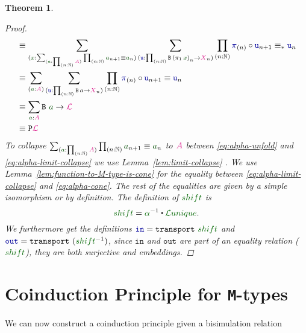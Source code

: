 \documentclass[twoside,11pt,openright]{report}
\theoremstyle{plain} %
\newtheorem{thm}{Theorem}[section]
\theoremstyle{definition}
\theoremstyle{remark}
\newcommand*{\lemref}[1]{Lemma~\ref{lem:#1}}
\newcommand*{\term}[1]{\textcolor{green!30!black}{#1}} %
\newcommand*{\pathterm}[1]{\textcolor{green!40!black}{#1}}
\newcommand*{\type}[1]{\textcolor{magenta!90!black}{#1}}
\newcommand*{\function}[1]{\textcolor{blue!60!black}{\ensuremath{\mathtt{#1}}}}
\newcommand*{\typeformer}[1]{\ensuremath{\mathtt{#1}}}
\newcommand*{\functor}[1]{\ensuremath{\mathbf{\mathtt{#1}}}}
\newcommand{\ct}{%
  \mathchoice{\mathbin{\raisebox{0.5ex}{$\displaystyle\centerdot$}}}%
             {\mathbin{\raisebox{0.5ex}{$\centerdot$}}}%
             {\mathbin{\raisebox{0.25ex}{$\scriptstyle\,\centerdot\,$}}}%
             {\mathbin{\raisebox{0.1ex}{$\scriptscriptstyle\,\centerdot\,$}}}
}
\newcommand*{\sym}[1]{\ensuremath{#1^{-1}}}
\begin{document}
\begin{thm}
\begin{proof}
\begin{align}
      &\equiv \sum_{(\term{x} : \sum_{(\term{a} : \prod_{(n : \mathbb{N})} \type{A})} \prod_{(n : \mathbb{N})} \term{a}_{n+1} \equiv \term{a}_n)} \sum_{(\function{u} : \prod_{(n : \mathbb{N})} \typeformer{B}\,{(\pi_1\,\term{x})}_n \rightarrow \type{X}_n)} \prod_{(n : \mathbb{N})} \function{\pi}_{(n)} \circ \function{u}_{n+1} \equiv_* \function{u}_n \label{eq:alpha-unfold} \\
      &\equiv \sum_{(\term{a} : \type{A})} \sum_{(\function{u} : \prod_{(n : \mathbb{N})} \typeformer{B}\,a \rightarrow \type{X}_n)} \prod_{(n : \mathbb{N})} \function{\pi}_{(n)} \circ \function{u}_{n+1} \equiv \function{u}_n \label{eq:alpha-limit-collapse} \\
      &\equiv \sum_{\term{a} : \type{A}} \typeformer{B}~\term{a} \rightarrow \type{\mathcal{L}} \label{eq:alpha-cone}\\
      &\equiv \functor{P}\type{\mathcal{L}}
    \end{align}
    To collapse \(\sum_{(\term{a} : \prod_{(n : \mathbb{N})} \type{A})} \prod_{(n : \mathbb{N})} \term{a}_{n+1} \equiv \term{a}_n\) to \(\type{A}\) between \eqref{eq:alpha-unfold} and \eqref{eq:alpha-limit-collapse} we use \lemref{limit-collapse} . We use \lemref{function-to-M-type-is-cone} for the equality between \eqref{eq:alpha-limit-collapse} and \eqref{eq:alpha-cone}. The rest of the equalities are given by a simple isomorphism or by definition. The definition of \(\pathterm{shift}\) is
    \begin{equation}
      \pathterm{shift} = \sym{\pathterm{\alpha}} \ct \pathterm{\mathcal{L}unique}.
    \end{equation}
    We furthermore get the definitions \(\function{in} = \mathtt{transport}~\pathterm{shift}\) and \(\function{out} = \mathtt{transport}~(\sym{\pathterm{shift}})\), since \function{in} and \function{out} are part of an equality relation (\(\pathterm{shift}\)), they are both surjective and embeddings.
    \end{proof}
\end{thm}

\section{Coinduction Principle for \texttt{M}-types}
We can now construct a coinduction principle given a bisimulation relation
\end{document}
